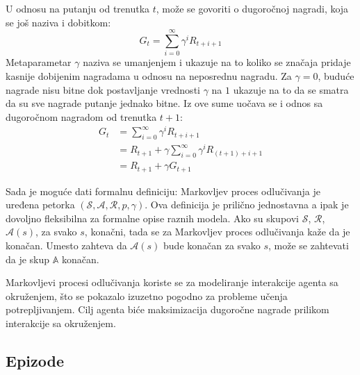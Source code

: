 U odnosu na putanju od trenutka $t$, može se govoriti o dugoročnoj nagradi, koja se još naziva i dobitkom:
\begin{equation}
\label{eq:dug_suma}
	G_t = \sum_{i=0}^{\infty} \gamma^iR_{t+i+1}
\end{equation}
Metaparametar $\gamma$ naziva se umanjenjem i ukazuje na to koliko se značaja pridaje kasnije dobijenim nagradama u odnosu na neposrednu nagradu. Za $\gamma = 0$, buduće nagrade nisu bitne dok postavljanje vrednosti $\gamma$ na $1$ ukazuje na to da se smatra da su sve nagrade putanje jednako bitne. Iz ove sume uočava se i odnos sa dugoročnom nagradom od trenutka $t+1$:
\begin{equation}
	\begin{aligned}
		G_t &= \sum_{i=0}^{\infty} \gamma^iR_{t+i+1} \\
        	&= R_{t+1} + \gamma\sum_{i=0}^{\infty} \gamma^iR_{(t+1)+i+1} \\
        	&=R_{t+1} + \gamma G_{t+1}
	\end{aligned}
\end{equation}
\par 
Sada je moguće dati formalnu definiciju: Markovljev proces odlučivanja je uređena petorka $(\mathcal{S}, \mathcal{A}, \mathcal{R}, p, \gamma)$. Ova definicija je prilično jednostavna a ipak je dovoljno fleksibilna za formalne opise raznih modela. Ako su skupovi $\mathcal{S}$, $\mathcal{R}$, $\mathcal{A}(s)$, za svako $s$, konačni, tada se za Markovljev proces odlučivanja kaže da je konačan. Umesto zahteva da $\mathcal{A}(s)$ bude konačan za svako $s$, može se zahtevati da je skup $\mathbb{A}$ konačan.
\par 
Markovljevi procesi odlučivanja koriste se za modeliranje interakcije agenta sa okruženjem, što se pokazalo izuzetno pogodno za probleme učenja potrepljivanjem. Cilj agenta biće maksimizacija dugoročne nagrade prilikom interakcije sa okruženjem.


\subsection{Epizode}

